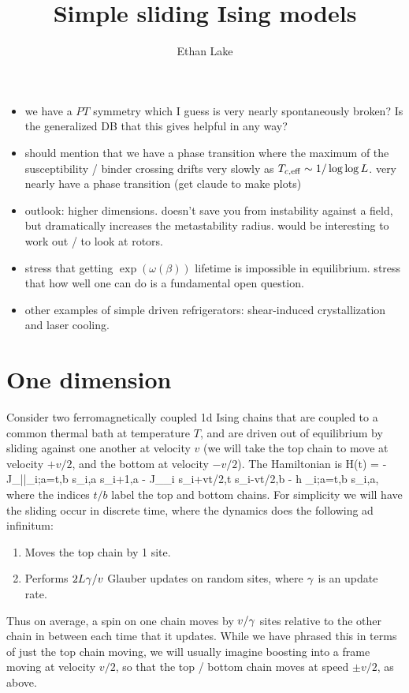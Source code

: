 \documentclass[12pt]{article}
\newcommand{\prl}{{||}}
\begin{document}
	\title{Simple sliding Ising models}
	\author{Ethan Lake}
	\date{} 
	\maketitle 
	
		\begin{itemize}
		\item we have a $PT$ symmetry which I guess is very nearly spontaneously broken? Is the generalized DB that this gives helpful in any way? 
		\item should mention that we have a phase transition where the maximum of the susceptibility / binder crossing drifts very slowly as $T_{c,{\rm eff}} \sim 1/\log \log L$. very nearly have a phase transition (get claude to make plots) 
		\item outlook: higher dimensions. doesn't save you from instability against a field, but dramatically increases the metastability radius. would be interesting to work out / to look at rotors. 
		\item stress that getting $\exp(\omega(\beta))$ lifetime is impossible in equilibrium. stress that how well one can do is a fundamental open question. 
		\item other examples of simple driven refrigerators: shear-induced crystallization and laser cooling. 
	\end{itemize}

	\section*{One dimension} 
	
	Consider two ferromagnetically coupled 1d Ising chains that are coupled to a common thermal bath at temperature $T$, and are driven out of equilibrium by sliding against one another at velocity $v$ (we will take the top chain to move at velocity $+v/2$, and the bottom at velocity $-v/2$). The Hamiltonian is 
	\be H(t) = -J_\prl \sum_{i;a=t,b} s_{i,a} s_{i+1,a} - J_\perp  \sum_i s_{i+vt/2,t} s_{i-vt/2,b} - h \sum_{i;a=t,b} s_{i,a},\ee 
	where the indices $t/b$ label the top and bottom chains. For simplicity we will have the sliding occur in discrete time, where the dynamics does the following ad infinitum: 
	\begin{enumerate}
		\item Moves the top chain by 1 site. 
		\item Performs $2L\gamma/v$ Glauber updates on random sites, where $\gamma$ is an update rate. 
	\end{enumerate}
	Thus on average, a spin on one chain moves by $v/\gamma$ sites relative to the other chain in between each time that it updates. While we have phrased this in terms of just the top chain moving, we will usually imagine boosting into a frame moving at velocity $v/2$, so that the top / bottom chain moves at speed $\pm v/2$, as above. 
		
\end{document}
